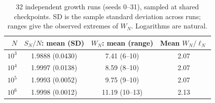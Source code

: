 \begin{table}[htbp]
\centering\small
\caption{32 independent growth runs (seeds 0--31), sampled at shared
checkpoints. SD is the sample standard deviation across runs;
ranges give the observed extremes of $W_N$. Logarithms are natural.}
\label{tab:experiments}
\begin{tabular}{rccc}
\toprule
$N$ & $S_N/N$: mean (SD) & $W_N$: mean (range) & Mean $W_N/\ell_N$ \\
\midrule
$10^{3}$ & 1.9888 (0.0430) & 7.41 (6--10) & 2.07 \\
$10^{4}$ & 1.9997 (0.0138) & 8.59 (8--10) & 2.07 \\
$10^{5}$ & 1.9993 (0.0052) & 9.75 (9--10) & 2.07 \\
$10^{6}$ & 1.9998 (0.0012) & 11.19 (10--13) & 2.13 \\
\bottomrule
\end{tabular}
\end{table}
